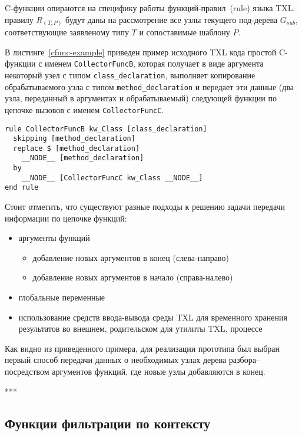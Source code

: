 C-функции опираются на специфику работы функций-правил~(rule) языка TXL: правилу $R_{(T,P)}$ будут даны на рассмотрение все узлы текущего под-дерева $G_{sub}$, соответствующие заявленому типу $T$ и сопоставимые шаблону $P$.

В листинге~\ref{cfunc-example} приведен пример исходного TXL кода простой C-функции с именем \lstinline{CollectorFuncB}, которая получает в виде аргумента некоторый узел с типом \lstinline{class_declaration}, выполняет копирование обрабатываемого узла с типом \lstinline{method_declaration} и передает эти данные (два узла, переданный в аргументах и обрабатываемый) следующей функции по цепочке вызовов с именем \lstinline{CollectorFuncC}.

\begin{lstlisting}[frame=single, language=TXL, label={cfunc-example}, caption={Пример C-функции}]
rule CollectorFuncB kw_Class [class_declaration]
  skipping [method_declaration]
  replace $ [method_declaration]
    __NODE__ [method_declaration]
  by
    __NODE__ [CollectorFuncC kw_Class __NODE__]
end rule
\end{lstlisting}

Стоит отметить, что существуют разные подходы к решению задачи передачи информации по цепочке функций:
\begin {itemize}
  \item аргументы функций
    \begin{itemize}
      \item добавление новых аргументов в конец (слева-направо)
      \item добавление новых аргументов в начало (справа-налево)
    \end{itemize}
  \item глобальные переменные
  \item использование средств ввода-вывода среды TXL для временного хранения результатов во внешнем, родительском для утилиты TXL, процессе
\end{itemize}

Как видно из приведенного примера, для реализации прототипа был выбран первый способ передачи данных о необходимых узлах дерева разбора-- посредством аргументов функций, где новые узлы добавляются в конец.

***

\subsection{Функции фильтрации по контексту}

